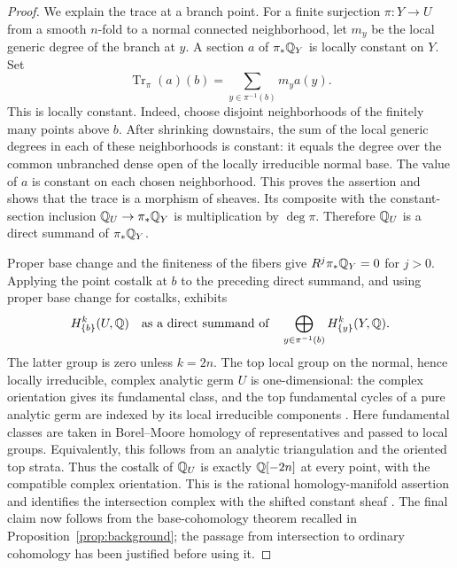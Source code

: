 \begin{proof}
We explain the trace at a branch point.  For a finite surjection
$\pi:Y\to U$ from a smooth $n$-fold to a normal connected
neighborhood, let $m_y$ be the local generic degree of the branch at
$y$.  A section $a$ of $\pi_*\mathbb Q_Y$ is locally constant on $Y$.
Set
\[
 \operatorname{Tr}_{\pi}(a)(b)
       =\sum_{y\in\pi^{-1}(b)}m_y a(y).
\]
This is locally constant.  Indeed, choose disjoint neighborhoods of
the finitely many points above $b$.  After shrinking downstairs, the
sum of the local generic degrees in each of these neighborhoods is
constant: it equals the degree over the common unbranched dense open
of the locally irreducible normal base.  The value of $a$ is constant
on each chosen neighborhood.  This proves the assertion and shows
that the trace is a morphism of sheaves.  Its composite with the
constant-section inclusion $\mathbb Q_U\to\pi_*\mathbb Q_Y$ is multiplication by
$\deg\pi$.  Therefore $\mathbb Q_U$ is a direct summand of
$\pi_*\mathbb Q_Y$.

Proper base change and the finiteness of the fibers give
$R^j\pi_*\mathbb Q_Y=0$ for $j>0$.  Applying the point costalk at $b$ to
the preceding direct summand, and using proper base change for
costalks, exhibits
\[
 H^k_{\{b\}}(U,\mathbb Q)
       \quad\text{as a direct summand of}\quad
 \bigoplus_{y\in\pi^{-1}(b)}H^k_{\{y\}}(Y,\mathbb Q).
\]
The latter group is zero unless $k=2n$.  The top local group on the
normal, hence locally irreducible, complex analytic germ $U$ is
one-dimensional: the complex orientation gives its fundamental
class, and the top fundamental cycles of a pure analytic germ are
indexed by its local irreducible components
\cite[Section~1.4, Theorem~3.2, Section~3.3 and Lemma~4.3]{BorelHaefliger1961}.
Here fundamental classes are taken in Borel--Moore homology of
representatives and passed to local groups. Equivalently, this
follows from an analytic triangulation and the oriented top strata.
Thus the costalk of $\mathbb Q_U$ is exactly $\mathbb Q[-2n]$ at every point,
with the compatible complex orientation.  This is the rational
homology-manifold assertion and identifies the intersection complex
with the shifted constant sheaf
\cite[Theorem~1.1(1)$\Leftrightarrow$(4)]{Massey2005}.
The final claim now follows from
the base-cohomology theorem recalled in
Proposition~\ref{prop:background}; the passage from intersection to
ordinary cohomology has been justified before using it.
\end{proof}

